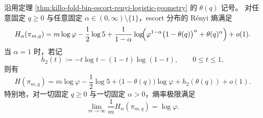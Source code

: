 \begin{theorem}\label{thm:killo-fold-bin-escort-renyi-entropy}
沿用定理 \ref{thm:killo-fold-bin-escort-renyi-logistic-geometry} 的 \(\theta(q)\) 记号。
对任意固定 \(q\ge 0\) 与任意固定 \(\alpha\in(0,\infty)\setminus\{1\}\)，escort 分布的 Rényi 熵满足
\[
H_\alpha(\pi_{m,q})
=
m\log\varphi
-\frac12\log 5
+\frac{1}{1-\alpha}
\log\!\Bigl(
\varphi^{1-\alpha}\bigl(1-\theta(q)\bigr)^\alpha+\theta(q)^\alpha
\Bigr)
+o(1).
\]
当 \(\alpha=1\) 时，若记
\[
h_2(t):=-t\log t-(1-t)\log(1-t),
\qquad 0\le t\le 1,
\]
则有
\[
H(\pi_{m,q})
=
m\log\varphi
-\frac12\log 5
+\bigl(1-\theta(q)\bigr)\log\varphi
+h_2(\theta(q))
+o(1).
\]
特别地，对一切固定 \(q\ge 0\) 与一切固定 \(\alpha>0\)，熵率极限满足
\[
\lim_{m\to\infty}\frac{1}{m}H_\alpha(\pi_{m,q})=\log\varphi.
\]
\end{theorem}
